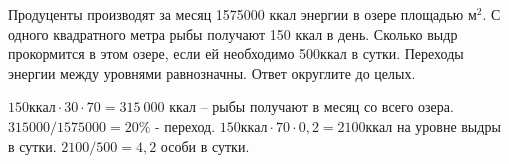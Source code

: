 
Продуценты
производят за месяц 1575000 ккал энергии в озере площадью  м$^2$. С
одного квадратного метра рыбы получают 150 ккал в день. Сколько выдр
прокормится в этом озере, если ей необходимо 500ккал в сутки. Переходы энергии
между уровнями равнозначны. Ответ округлите до целых.

\solutionSection

$150\text{ккал} \cdot 30 \cdot 70=315~000$ ккал – рыбы получают в месяц со всего озера. 
$315000/1575000=20\%$ - переход.  $150\text{ккал} \cdot 70 \cdot 0,2=2100$ккал на уровне выдры в сутки. 
$2100/500=4,2$ особи в сутки. 

